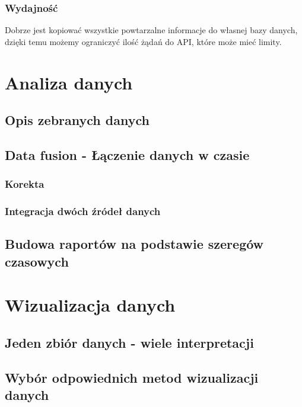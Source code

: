\documentclass[brudnopis]{xmgr}
\begin{document}
        \subsection*{Wydajność}
        Dobrze jest kopiować wszystkie powtarzalne informacje do własnej bazy danych,
        dzięki temu możemy ograniczyć ilość żądań do API, które może mieć limity.

\chapter{Analiza danych}

    \section{Opis zebranych danych}

    \section{Data fusion - Łączenie danych w czasie}

        \subsection*{Korekta}

        \subsection*{Integracja dwóch źródeł danych}

     \section{Budowa raportów na podstawie szeregów czasowych}

\chapter{Wizualizacja danych}

     \section{Jeden zbiór danych - wiele interpretacji}

     \section{Wybór odpowiednich metod wizualizacji danych}
\end{document}
